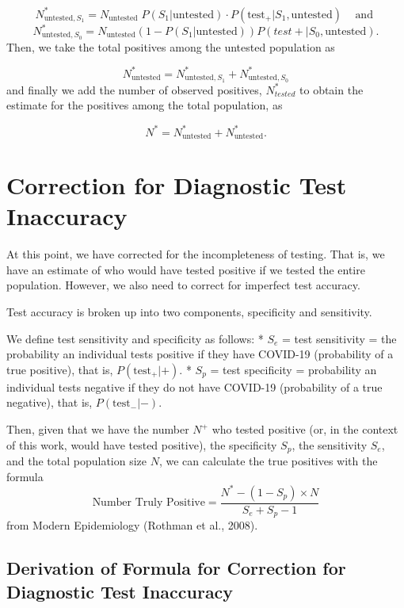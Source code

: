 \documentclass[12pt,twoside]{smiththesis}
\begin{document}
\[N^*_{\text{untested},S_1} = N_{\text{untested}} \; P(S_1|\text{untested}) \cdot P(\text{test}_+ | S_1,\text{untested}) \;\;\;\text{ and }\]
\[N^*_{\text{untested},S_0} = N_{\text{untested}}(1-P(S_1|\text{untested}))P(test + | S_0,\text{untested}).\]
Then, we take the total positives among the untested population as

\[N^*_{\text{untested}} = N^*_{\text{untested},S_1} + N^*_{\text{untested},S_0}\]
and finally we add the number of observed positives, \(N^*_{tested}\) to obtain the estimate for the positives among the total population, as

\[N^* = N^*_{\text{untested}} +N^*_{\text{untested}}.\]

\hypertarget{correct-test-inaccuracy}{%
\section{Correction for Diagnostic Test Inaccuracy}\label{correct-test-inaccuracy}}

At this point, we have corrected for the incompleteness of testing. That is, we have an estimate of who would have tested positive if we tested the entire population. However, we also need to correct for imperfect test accuracy.

Test accuracy is broken up into two components, specificity and sensitivity.

We define test sensitivity and specificity as follows:
* \(S_e\) = test sensitivity = the probability an individual tests positive if they have COVID-19 (probability of a true positive), that is, \(P(\text{test}_+ | +)\).
* \(S_p\) = test specificity = probability an individual tests negative if they do not have COVID-19 (probability of a true negative), that is, \(P(\text{test}_- |-)\).

Then, given that we have the number \(N^+\) who tested positive (or, in the context of this work, would have tested positive), the specificity \(S_p\), the sensitivity \(S_e\), and the total population size \(N\), we can calculate the true positives with the formula
\[\text{Number Truly Positive} = \dfrac{N^* - (1-S_p) \times N}{S_e+S_p-1}\]
from Modern Epidemiology (Rothman et al., 2008).

\hypertarget{derivation-of-formula-for-correction-for-diagnostic-test-inaccuracy}{%
\subsection{Derivation of Formula for Correction for Diagnostic Test Inaccuracy}\label{derivation-of-formula-for-correction-for-diagnostic-test-inaccuracy}}
\end{document}
